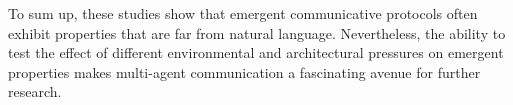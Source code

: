 To sum up, these studies show that emergent communicative protocols often exhibit properties that are far from natural language. Nevertheless, the ability to test the effect of different environmental and architectural pressures on emergent properties makes multi-agent communication a fascinating avenue for further research. 



